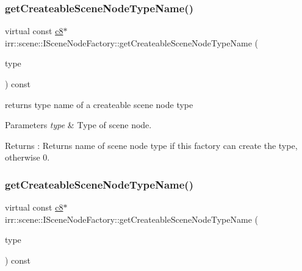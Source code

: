\subsubsection{\texorpdfstring{get\+Createable\+Scene\+Node\+Type\+Name()}{getCreateableSceneNodeTypeName()}\hspace{0.1cm}{\footnotesize\ttfamily [3/4]}}
{\footnotesize\ttfamily virtual const \hyperlink{namespaceirr_a9395eaea339bcb546b319e9c96bf7410}{c8}$\ast$ irr\+::scene\+::\+I\+Scene\+Node\+Factory\+::get\+Createable\+Scene\+Node\+Type\+Name (\begin{DoxyParamCaption}\item[{\hyperlink{namespaceirr_1_1scene_acad3d7ef92a9807d391ba29120f3b7bd}{E\+S\+C\+E\+N\+E\+\_\+\+N\+O\+D\+E\+\_\+\+T\+Y\+PE}}]{type }\end{DoxyParamCaption}) const\hspace{0.3cm}{\ttfamily [pure virtual]}}



returns type name of a createable scene node type 


\begin{DoxyParams}{Parameters}
{\em type} & Type of scene node. \\
\hline
\end{DoxyParams}
\begin{DoxyReturn}{Returns}
\+: Returns name of scene node type if this factory can create the type, otherwise 0. 
\end{DoxyReturn}
\mbox{\label{classirr_1_1scene_1_1ISceneNodeFactory_addc09a5ab7a8d8b65182fbaa09c88b6f}} 
\subsubsection{\texorpdfstring{get\+Createable\+Scene\+Node\+Type\+Name()}{getCreateableSceneNodeTypeName()}\hspace{0.1cm}{\footnotesize\ttfamily [4/4]}}
{\footnotesize\ttfamily virtual const \hyperlink{namespaceirr_a9395eaea339bcb546b319e9c96bf7410}{c8}$\ast$ irr\+::scene\+::\+I\+Scene\+Node\+Factory\+::get\+Createable\+Scene\+Node\+Type\+Name (\begin{DoxyParamCaption}\item[{\hyperlink{namespaceirr_1_1scene_acad3d7ef92a9807d391ba29120f3b7bd}{E\+S\+C\+E\+N\+E\+\_\+\+N\+O\+D\+E\+\_\+\+T\+Y\+PE}}]{type }\end{DoxyParamCaption}) const\hspace{0.3cm}{\ttfamily [pure virtual]}}



